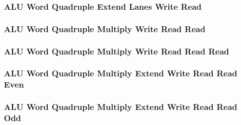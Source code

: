 

\subsubsection[{\small ALU Word Quadruple Extend Lanes Write Read}]{ALU Word Quadruple Extend Lanes Write Read} \label{sec:format-ALU-WQEXTLWR}



\subsubsection[{\small ALU Word Quadruple Multiply Write Read Read}]{ALU Word Quadruple Multiply Write Read Read} \label{sec:format-ALU-WQMWRR}



\subsubsection[{\small ALU Word Quadruple Multiply Write Read Read Read}]{ALU Word Quadruple Multiply Write Read Read Read} \label{sec:format-ALU-WQMWRRR}



\subsubsection[{\small ALU Word Quadruple Multiply Extend Write Read Read Even}]{ALU Word Quadruple Multiply Extend Write Read Read Even} \label{sec:format-ALU-WQMEWRRE}



\subsubsection[{\small ALU Word Quadruple Multiply Extend Write Read Read Odd}]{ALU Word Quadruple Multiply Extend Write Read Read Odd} \label{sec:format-ALU-WQMEWRRO}

